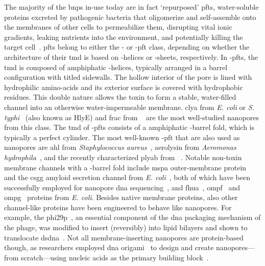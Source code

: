 The majority of the \glspl{bnp} in-use today are in fact `repurposed' \glspl{pft}, water-soluble proteins
excreted by pathogenic bacteria that oligomerize and self-assemble onto the membranes of other cells to
permeabilize them, disrupting vital ionic gradients, leaking nutrients into the environment, and potentially
killing the target cell~\cite{Peraro-2015}. \Glspl{pft} belong to either the \ta- or \tb-\gls{pft} class,
depending on whether the architecture of their \gls{tmd} is based on \ta-helices or \tb-sheets, respectively.
In \ta-\glspl{pft}, the \gls{tmd} is composed of amphiphatic \ta-helices, typically arranged in a barrel
configuration with titled sidewalls. The hollow interior of the pore is lined with hydrophilic amino-acids and
its exterior surface is covered with hydrophobic residues. This double nature allows the toxin to form a
stable, water-filled channel into an otherwise water-impermeable membrane. \Gls{clya} from \textit{E. coli} or
\textit{S. typhi}~\cite{Mueller-2009} (also known as HlyE) and \gls{frac} from ~\cite{Tanaka-2015} are the most well-studied nanopores from this class. The \gls{tmd} of
\tb-\glspl{pft} consists of a amphiphatic \tb-barrel fold, which is typically a perfect cylinder. The most
well-known \tb-\gls{pft} that are also used as nanopores are \gls{ahl} from \textit{Staphylococcus
aureus}~\cite{Song-1996}, aerolysin from \textit{Aeromonas hydrophila}~\cite{Iacovache-2016}, and the recently
characterized \gls{plyab} from \textit{}~\cite{Lukoyanova-Kondos-2015}. Notable non-toxin membrane channels
with a \tb-barrel fold include \gls{mspa} outer-membrane protein~\cite{Faller-2004} and the \gls{csgg} amyloid
secretion channel from \textit{E. coli}~\cite{Goyal-2014}, both of which have been successfully employed for
nanopore \gls{dna} sequencing~\cite{Manrao-2012,Brown-2016}, and \gls{fhua}~\cite{Locher-1998},
\gls{ompf}~\cite{Yamashita-2008} and \gls{ompg}~\cite{Subbarao-2006} proteins from \textit{E. coli}. Besides
native membrane proteins, also other channel-like proteins have been engineered to behave like nanopores. For
example, the \gls{phi29p}~\cite{Xu-2019}, an essential component of the \gls{dna} packaging mechanism of the
 phage, was modified to insert (reversibly) into lipid bilayers and shown to translocate
\gls{dsdna}~\cite{Wendell-2009}. Not all membrane-inserting nanopores are protein-based though, as researchers
employed \gls{dna} origami~\cite{Rothemund-2006} to design and create nanopores---from scratch---using nucleic
acids as the primary building
block~\cite{Bell-2011,Langecker-2012,Burns-2013,Bell-2014,Gopfrich-2016,Gopfrich-2019}.


